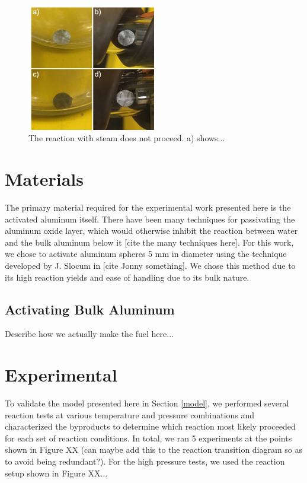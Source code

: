 \documentclass[preprint,12pt,3p]{elsarticle}
\begin{document}
\begin{figure}
  \centering
  \includegraphics[width=0.5\textwidth]{fig/steam_test_min}
  \caption{The reaction with steam does not proceed. a) shows...}
  \label{fig:steam_test}
\end{figure}

\section{Materials}
\label{materials}

The primary material required for the experimental work presented here is the
activated aluminum itself. There have been many techniques for passivating the
aluminum oxide layer, which would otherwise inhibit the reaction between water
and the bulk aluminum below it [cite the many techniques here]. For this work,
we chose to activate aluminum spheres 5 mm in diameter using the technique
developed by J. Slocum in [cite Jonny something]. We chose this method due to
its high reaction yields and ease of handling due to its bulk nature.

\subsection{Activating Bulk Aluminum}

Describe how we actually make the fuel here...

\section{Experimental}
\label{experiment}

To validate the model presented here in Section \ref{model}, we performed
several reaction tests at various temperature and pressure combinations and
characterized the byproducts to determine which reaction most likely proceeded
for each set of reaction conditions. In total, we ran 5 experiments at the
points shown in Figure XX (can maybe add this to the reaction transition diagram
so as to avoid being redundant?). For the high pressure tests, we used the
reaction setup shown in Figure XX...
\end{document}
